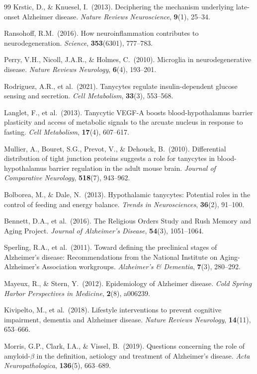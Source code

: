 ﻿\documentclass[12pt,a4paper]{article}
\theoremstyle{definition}
\begin{document}
\begin{thebibliography}{99}
		Krstic, D., \& Knuesel, I.\ (2013). Deciphering the mechanism underlying late-onset Alzheimer disease. \textit{Nature Reviews Neuroscience}, \textbf{9}(1), 25--34.

		Ransohoff, R.M.\ (2016). How neuroinflammation contributes to neurodegeneration. \textit{Science}, \textbf{353}(6301), 777--783.

		Perry, V.H., Nicoll, J.A.R., \& Holmes, C.\ (2010). Microglia in neurodegenerative disease. \textit{Nature Reviews Neurology}, \textbf{6}(4), 193--201.

		Rodriguez, A.R., et al.\ (2021). Tanycytes regulate insulin-dependent glucose sensing and secretion. \textit{Cell Metabolism}, \textbf{33}(3), 553--568.

		Langlet, F., et al.\ (2013). Tanycytic VEGF-A boosts blood-hypothalamus barrier plasticity and access of metabolic signals to the arcuate nucleus in response to fasting. \textit{Cell Metabolism}, \textbf{17}(4), 607--617.

		Mullier, A., Bouret, S.G., Prevot, V., \& Dehouck, B.\ (2010). Differential distribution of tight junction proteins suggests a role for tanycytes in blood-hypothalamus barrier regulation in the adult mouse brain. \textit{Journal of Comparative Neurology}, \textbf{518}(7), 943--962.

		Bolborea, M., \& Dale, N.\ (2013). Hypothalamic tanycytes: Potential roles in the control of feeding and energy balance. \textit{Trends in Neurosciences}, \textbf{36}(2), 91--100.

		Bennett, D.A., et al.\ (2016). The Religious Orders Study and Rush Memory and Aging Project. \textit{Journal of Alzheimer's Disease}, \textbf{54}(3), 1051--1064.

		Sperling, R.A., et al.\ (2011). Toward defining the preclinical stages of Alzheimer's disease: Recommendations from the National Institute on Aging-Alzheimer's Association workgroups. \textit{Alzheimer's \& Dementia}, \textbf{7}(3), 280--292.

		Mayeux, R., \& Stern, Y.\ (2012). Epidemiology of Alzheimer disease. \textit{Cold Spring Harbor Perspectives in Medicine}, \textbf{2}(8), a006239.

		Kivipelto, M., et al.\ (2018). Lifestyle interventions to prevent cognitive impairment, dementia and Alzheimer disease. \textit{Nature Reviews Neurology}, \textbf{14}(11), 653--666.

		Morris, G.P., Clark, I.A., \& Vissel, B.\ (2019). Questions concerning the role of amyloid-$\beta$ in the definition, aetiology and treatment of Alzheimer's disease. \textit{Acta Neuropathologica}, \textbf{136}(5), 663--689.

	\end{thebibliography}
	
\end{document}
